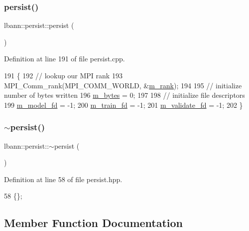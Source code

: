 \subsubsection{\texorpdfstring{persist()}{persist()}}
{\footnotesize\ttfamily lbann\+::persist\+::persist (\begin{DoxyParamCaption}{ }\end{DoxyParamCaption})}



Definition at line 191 of file persist.\+cpp.


\begin{DoxyCode}
191                       \{
192   \textcolor{comment}{// lookup our MPI rank}
193   MPI\_Comm\_rank(MPI\_COMM\_WORLD, &\hyperlink{classlbann_1_1persist_aa99b1b0079bb10471472bf6f1d966deb}{m\_rank});
194 
195   \textcolor{comment}{// initialize number of bytes written}
196   \hyperlink{classlbann_1_1persist_a0bd4fd42d9858a5210c8034dfbb666d4}{m\_bytes} = 0;
197 
198   \textcolor{comment}{// initialize file descriptors}
199   \hyperlink{classlbann_1_1persist_a1adc7102c1b4bc91534ca156decbd965}{m\_model\_fd} = -1;
200   \hyperlink{classlbann_1_1persist_a817671390811dde04670c47139402f51}{m\_train\_fd} = -1;
201   \hyperlink{classlbann_1_1persist_a87927d03b0cf684023178f997c038783}{m\_validate\_fd} = -1;
202 \}
\end{DoxyCode}
\mbox{\label{classlbann_1_1persist_ac0d475c0174f7dbd805a0b0603277cfa}} 
\subsubsection{\texorpdfstring{$\sim$persist()}{~persist()}}
{\footnotesize\ttfamily lbann\+::persist\+::$\sim$persist (\begin{DoxyParamCaption}{ }\end{DoxyParamCaption})\hspace{0.3cm}{\ttfamily [inline]}}



Definition at line 58 of file persist.\+hpp.


\begin{DoxyCode}
58 \{\};
\end{DoxyCode}


\subsection{Member Function Documentation}
\mbox{\label{classlbann_1_1persist_ab099939d0d91101fbfaf2b85e78be032}} 
